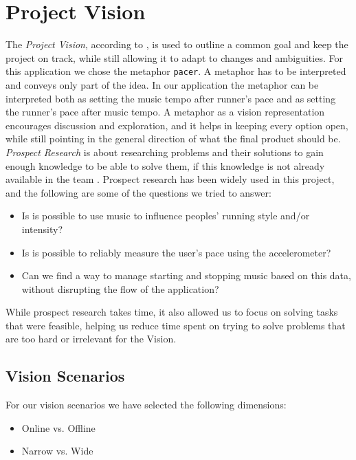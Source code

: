 \section{Project Vision}
The \textit{Project Vision}, according to \citet[ p. 104]{essence}, is used to outline a common goal and keep the project on track, while still allowing it to adapt to changes and ambiguities.
For this application we chose the metaphor \texttt{pacer}. A metaphor \citep[ pp. 172-174]{essence} has to be interpreted and conveys only part of the idea. In our application the metaphor can be interpreted both as setting the music tempo after runner's pace and as setting the runner's pace after music tempo.
A metaphor as a vision representation encourages discussion and exploration, and it helps in keeping every option open, while still pointing in the general direction of what the final product should be.\\

\noindent \textit{Prospect Research} is about researching problems and their solutions to gain enough knowledge to be able to solve them, if this knowledge is not already available in the team \citep[ pp. 104-105]{essence}.
Prospect research has been widely used in this project, and the following are some of the questions we tried to answer:

\begin{itemize}
	\item Is is possible to use music to influence peoples' running style and/or intensity?
	\item Is is possible to reliably measure the user's pace using the accelerometer?
	\item Can we find a way to manage starting and stopping music based on this data, without disrupting the flow of the application?
\end{itemize}

While prospect research takes time, it also allowed us to focus on solving tasks that were feasible, helping us reduce time spent on trying to solve problems that are too hard or irrelevant for the Vision.

\subsection*{Vision Scenarios}
For our vision scenarios \cite[ p. 127]{essence} we have selected the following dimensions:
\begin{itemize}
\item Online vs. Offline %
\item Narrow vs. Wide
\end{itemize}

